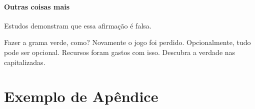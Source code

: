 \documentclass[
  english,
  lmodern,
  oneside
]{ufsc-thesis-rn46-2019/ufsc-thesis-rn46-2019}
\begin{document}
\subsubsection{Outras coisas mais}
\label{sec:other}
Estudos demonstram que essa afirmação é falsa.

\label{sec:yet-another}
Fazer a grama verde, como? Novamente o jogo foi perdido. Opcionalmente, tudo
pode ser opcional. Recursos foram gastos com isso. Descubra a verdade nas
capitalizadas.


\postextual


\apendices

\chapter{Exemplo de Apêndice}~\label{ch:apendice}

~\cite{turing1937} \lipsum[1]
\end{document}
